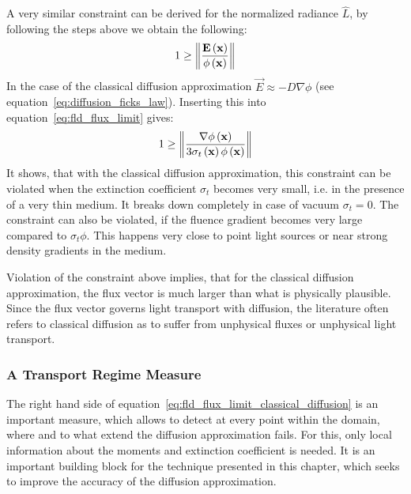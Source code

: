 A very similar constraint can be derived for the normalized radiance $\widehat{L}$, by following the steps above we obtain the following:
\begin{align}
\label{eq:fld_flux_limit}
1
\ge
\left\lVert
\frac{\boldsymbol{\mathbf{E}}\left(\boldsymbol{\mathbf{x}}\right)}{\phi\left(\boldsymbol{\mathbf{x}}\right)}
\right\rVert
\end{align}
In the case of the classical diffusion approximation $\vec{E}\approx-D\nabla\phi$ (see equation~\ref{eq:diffusion_ficks_law}). Inserting this into equation~\ref{eq:fld_flux_limit} gives:
\begin{align}
\label{eq:fld_flux_limit_classical_diffusion}
1
\ge
\left\lVert
\frac{\nabla\phi\left(\boldsymbol{\mathbf{x}}\right)}{3\sigma_t\left(\boldsymbol{\mathbf{x}}\right)\phi\left(\boldsymbol{\mathbf{x}}\right)}
\right\rVert
\end{align}
It shows, that with the classical diffusion approximation, this constraint can be violated when the extinction coefficient $\sigma_t$ becomes very small, i.e. in the presence of a very thin medium. It breaks down completely in case of vacuum $\sigma_t=0$. The constraint can also be violated, if the fluence gradient becomes very large compared to $\sigma_t\phi$. This happens very close to point light sources or near strong density gradients in the medium.

Violation of the constraint above implies, that for the classical diffusion approximation, the flux vector is much larger than what is physically plausible. Since the flux vector governs light transport with diffusion, the literature often refers to classical diffusion as to suffer from unphysical fluxes or unphysical light transport.


\subsubsection*{A Transport Regime Measure}

The right hand side of equation~\ref{eq:fld_flux_limit_classical_diffusion} is an important measure, which allows to detect at every point within the domain, where and to what extend the diffusion approximation fails. For this, only local information about the moments and extinction coefficient is needed. It is an important building block for the technique presented in this chapter, which seeks to improve the accuracy of the diffusion approximation.

